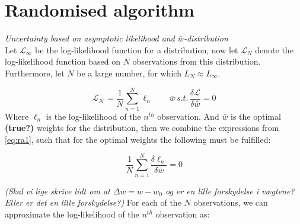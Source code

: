 \section{Randomised algorithm}
\emph{Uncertainty based on asymptotic likelihood and $\bar{w}$-distribution}\\
Let $\mathcal{L}_\infty$ be the log-likelihood function for a distribution, now let $\mathcal{L}_N$ denote the log-likelihood function based on $N$ observations from this distribution. Furthermore, let $N$ be a large number, for which $L_N \approx L_\infty$. 

\begin{equation}
\mathcal{L_N} = \frac{1}{N} \sum_{n=1}^N \ell_n \qquad \bar{w} \, s.t. \, \frac{\delta \mathcal{L}}{\delta \bar{w}} = \bar{0} \label{eq:ra1}
\end{equation}
Where $\ell_n$ is the log-likelihood of the $n^{th}$ observation. And $\bar{w}$ is the optimal \textbf{(true?)} weights for the distribution, then we combine the expressions from \eqref{eq:ra1}, such that for the optimal weights the following must be fulfilled:

\begin{equation}
\frac{1}{N} \sum_{n = 1}^N \frac{\delta \ell_n}{\delta \bar{w}} = 0 \label{eq:ra2}
\end{equation}

\emph{(Skal vi lige skrive lidt om at $\Delta w = w-w_0$ og er en lille forskydelse i vægtene? Eller er det en lille forskydelse?) }
For each of the $N$ observations, we can approximate the log-likelihood of the $n^{th}$ observation as:


